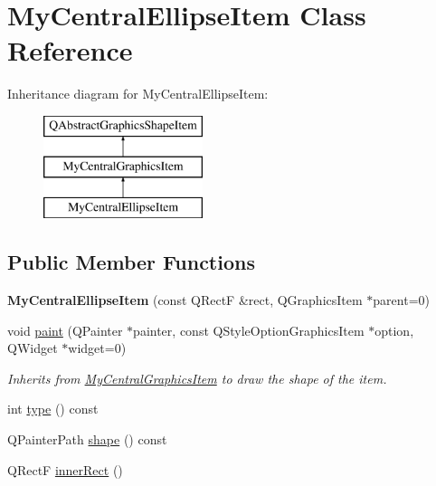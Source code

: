 \hypertarget{class_my_central_ellipse_item}{}\section{My\+Central\+Ellipse\+Item Class Reference}
\label{class_my_central_ellipse_item}
Inheritance diagram for My\+Central\+Ellipse\+Item\+:\begin{figure}[H]
\begin{center}
\leavevmode
\includegraphics[height=3.000000cm]{class_my_central_ellipse_item}
\end{center}
\end{figure}
\subsection*{Public Member Functions}
\begin{DoxyCompactItemize}
\item 
\hypertarget{class_my_central_ellipse_item_ac912023a16f5f6e6331b1fe861ca42d2}{}{\bfseries My\+Central\+Ellipse\+Item} (const Q\+Rect\+F \&rect, Q\+Graphics\+Item $\ast$parent=0)\label{class_my_central_ellipse_item_ac912023a16f5f6e6331b1fe861ca42d2}

\item 
void \hyperlink{class_my_central_ellipse_item_aa3ae037258cf9839002f8da7e83c3239}{paint} (Q\+Painter $\ast$painter, const Q\+Style\+Option\+Graphics\+Item $\ast$option, Q\+Widget $\ast$widget=0)
\begin{DoxyCompactList}\small\item\em Inherits from \hyperlink{class_my_central_graphics_item}{My\+Central\+Graphics\+Item} to draw the shape of the item. \end{DoxyCompactList}\item 
int \hyperlink{class_my_central_ellipse_item_a94c23343867dce46a608582dfe01fffb}{type} () const 
\item 
Q\+Painter\+Path \hyperlink{class_my_central_ellipse_item_a075835bf21a3d95317ece40e9ca3da7c}{shape} () const 
\item 
Q\+Rect\+F \hyperlink{class_my_central_ellipse_item_a97f879a0bb7cfa7270f33c3d77d5b7a0}{inner\+Rect} ()
\end{DoxyCompactItemize}
